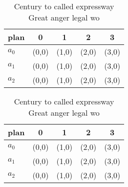 \documentclass[a4paper]{article}
\begin{document}
\begin{table}
\begin{adjustbox}{width=0.5\columnwidth}
\begin{tabular}{|l|l|l|l|l|}
\hline
\textbf{plan} & \multicolumn{1}{c|}{\textbf{0}} & \multicolumn{1}{c|}{\textbf{1}} & \multicolumn{1}{c|}{\textbf{2}} & \multicolumn{1}{c|}{\textbf{3}} \\ \hline
\textbf{$a_0$}  & (0,0) & (1,0) & (2,0) & (3,0) \\ \hline
\textbf{$a_1$}  & (0,0) & (1,0) & (2,0) & (3,0) \\ \hline
\textbf{$a_2$}  & (0,0) & (1,0) & (2,0) & (3,0) \\ \hline
\end{tabular}
\end{adjustbox}
\caption{Century to called expressway Great anger legal wo
}
\end{table}

\begin{table}
\begin{adjustbox}{width=0.5\columnwidth}
\begin{tabular}{|l|l|l|l|l|}
\hline
\textbf{plan} & \multicolumn{1}{c|}{\textbf{0}} & \multicolumn{1}{c|}{\textbf{1}} & \multicolumn{1}{c|}{\textbf{2}} & \multicolumn{1}{c|}{\textbf{3}} \\ \hline
\textbf{$a_0$}  & (0,0) & (1,0) & (2,0) & (3,0) \\ \hline
\textbf{$a_1$}  & (0,0) & (1,0) & (2,0) & (3,0) \\ \hline
\textbf{$a_2$}  & (0,0) & (1,0) & (2,0) & (3,0) \\ \hline
\end{tabular}
\end{adjustbox}
\caption{Century to called expressway Great anger legal wo
}
\end{table}
\end{document}
